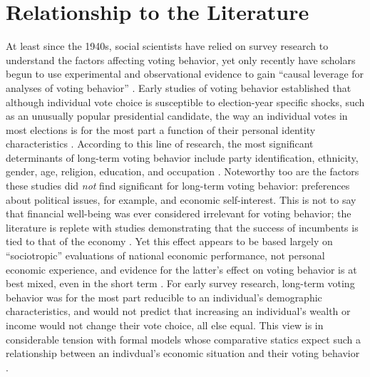 \section{Relationship to the Literature}
At least since the 1940s, social scientists have relied on survey research to understand the factors affecting voting behavior, yet only recently have scholars begun to use experimental and observational evidence to gain ``causal leverage for analyses of voting behavior'' \parencite{Bartels2010}. Early studies of voting behavior established that although individual vote choice is susceptible to election-year specific shocks, such as an unusually popular presidential candidate, the way an individual votes in most elections is for the most part a function of their personal identity characteristics \parencite{Converse1966}. According to this line of research, the most significant determinants of long-term voting behavior include party identification, ethnicity, gender, age, religion, education, and occupation \parencite{Lazarsfeld1948,Berelson1954,Campbell1960,Stanley2006a}. Noteworthy too are the factors these studies did \textit{not} find significant for long-term voting behavior: preferences about political issues, for example, and economic self-interest. This is not to say that financial well-being was ever considered irrelevant for voting behavior; the literature is replete with studies demonstrating that the success of incumbents is tied to that of the economy \parencite{Tufte1975,Meltzer1975,Hibbs1987}. Yet this effect appears to be based largely on ``sociotropic'' evaluations of national economic performance, not personal economic experience, and evidence for the latter's effect on voting behavior is at best mixed, even in the short term \parencite{Linn2010}.  For early survey research, long-term voting behavior was for the most part reducible to an individual's demographic characteristics, and would not predict that increasing an individual's wealth or income would not change their vote choice, all else equal.  This view is in considerable tension with formal models whose comparative statics expect such a relationship between an indivdual's economic situation and their voting behavior \parencite[e.g.,][]{Romer1975,Roberts1977,Meltzer1981}.

